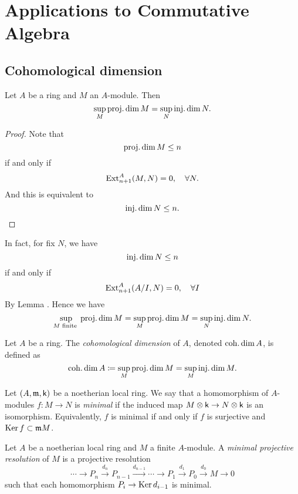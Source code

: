 \section{Applications to Commutative Algebra}


\subsection{Cohomological dimension}

    \begin{lemma}\label{lem: cohomological dimension is well-defined}
        Let \(A\) be a ring and \(M\) an \(A\)-module.
        Then 
        \[ \sup_{M} \operatorname{proj.dim} M = \sup_{N} \operatorname{inj.dim} N. \]
    \end{lemma}
    \begin{proof}
        Note that 
        \[ \operatorname{proj.dim} M \leq n \] 
        if and only if 
        \[ \operatorname{Ext}_{n+1}^A(M,N) = 0, \quad \forall N. \]
        And this is equivalent to
        \[ \operatorname{inj.dim} N \leq n. \]
    \end{proof}

    \begin{remark}\label{rmk: checking projective dimension of finite module is enough for cohomological dimension}
        In fact, for fix \(N\), we have 
        \[ \operatorname{inj.dim} N \leq n \]
        if and only if
        \[ \operatorname{Ext}_{n+1}^A(A/I,N) = 0, \quad \forall I \]
        By Lemma .
        Hence we have 
        \[ \sup_{M \text{ finite }} \operatorname{proj.dim} M = \sup_{M} \operatorname{proj.dim} M = \sup_{N} \operatorname{inj.dim} N. \]
    \end{remark}

    \begin{definition}
        Let \(A\) be a ring.
        The \emph{cohomological dimension} of \(A\), denoted \(\operatorname{coh.dim} A\), is defined as
        \[ \operatorname{coh.dim} A \coloneqq \sup_{M} \operatorname{proj.dim} M = \sup_{M} \operatorname{inj.dim} M. \]
    \end{definition}

    \begin{definition}\label{def: minimal homomorphism}
        Let \((A,{\mathfrak{m}},{\mathsf{k}})\) be a noetherian local ring.
        We say that a homomorphism of \(A\)-modules \(f: M \to N\) is \emph{minimal} 
        if the induced map \(M \otimes {\mathsf{k}} \to N \otimes {\mathsf{k}}\) is an isomorphism.
        Equivalently, \(f\) is minimal if and only if \(f\) is surjective and \(\operatorname{Ker} f \subset {\mathfrak{m}} M\).
    \end{definition}

    \begin{definition}\label{def: minimal projective resolution}
        Let \(A\) be a noetherian local ring and \(M\) a finite \(A\)-module.
        A \emph{minimal projective resolution} of \(M\) is a projective resolution
        \[ \cdots \to P_n \xrightarrow{d_n} P_{n-1} \xrightarrow{d_{n-1}} \cdots \to P_1 \xrightarrow{d_1} P_0 \xrightarrow{d_0} M \to 0 \]
        such that each homomorphism \(P_i \to \operatorname{Ker} d_{i-1}\) is minimal.
    \end{definition}

